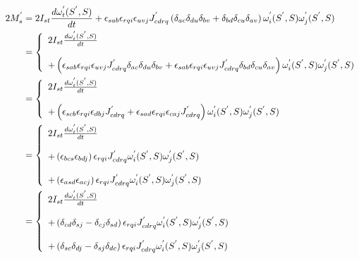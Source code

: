 \begin{align}
2M^{'}_{s}&=2I_{st}\dv{\omega^{'}_{t}(S^{'},S)}{t}+\epsilon_{sab}\epsilon_{rqi}\epsilon_{uvj}J^{'}_{cdrq}\left(\delta_{ac}\delta_{du}\delta_{bv}+\delta_{bd}\delta_{cu}\delta_{av}\right)\omega^{'}_{i}(S^{'},S)\omega^{'}_{j}(S^{'},S) \\
&=\left\{\begin{array}{l}
2I_{st}\dv{\omega^{'}_{t}(S^{'},S)}{t}\\\\ + \left(\epsilon_{sab}\epsilon_{rqi}\epsilon_{uvj}J^{'}_{cdrq}\delta_{ac}\delta_{du}\delta_{bv}+\epsilon_{sab}\epsilon_{rqi}\epsilon_{uvj}J^{'}_{cdrq}\delta_{bd}\delta_{cu}\delta_{av}\right)\omega^{'}_{i}(S^{'},S)\omega^{'}_{j}(S^{'},S) 
\end{array}\right.\\
&=\left\{\begin{array}{l}
2I_{st}\dv{\omega^{'}_{t}(S^{'},S)}{t}\\\\ + \left(\epsilon_{scb}\epsilon_{rqi}\epsilon_{dbj}J^{'}_{cdrq}+\epsilon_{sad}\epsilon_{rqi}\epsilon_{caj}J^{'}_{cdrq}\right)\omega^{'}_{i}(S^{'},S)\omega^{'}_{j}(S^{'},S) 
\end{array}\right.\\
&=\left\{\begin{array}{l}
2I_{st}\dv{\omega^{'}_{t}(S^{'},S)}{t}\\\\ + \left(\epsilon_{bcs}\epsilon_{bdj}\right)\epsilon_{rqi}J^{'}_{cdrq}\omega^{'}_{i}(S^{'},S)\omega^{'}_{j}(S^{'},S) \\\\+\left(\epsilon_{asd}\epsilon_{acj}\right)\epsilon_{rqi}J^{'}_{cdrq}\omega^{'}_{i}(S^{'},S)\omega^{'}_{j}(S^{'},S) 
\end{array}\right.\\
&=\left\{\begin{array}{l}
2I_{st}\dv{\omega^{'}_{t}(S^{'},S)}{t}\\\\ + \left(\delta_{cd}\delta_{sj}-\delta_{cj}\delta_{sd}\right)\epsilon_{rqi}J^{'}_{cdrq}\omega^{'}_{i}(S^{'},S)\omega^{'}_{j}(S^{'},S) \\\\+\left(\delta_{sc}\delta_{dj}-\delta_{sj}\delta_{dc}\right)\epsilon_{rqi}J^{'}_{cdrq}\omega^{'}_{i}(S^{'},S)\omega^{'}_{j}(S^{'},S) 
\end{array}\right.
\end{align}
